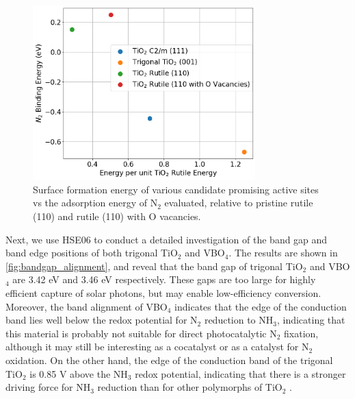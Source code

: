 \begin{figure}[h]
\centering
\includegraphics[width=8.6cm]{figures/metal_oxide_figures/Figure 7.png}
\caption{Surface formation energy of various candidate promising active sites vs the adsorption energy of N$_2$ evaluated, relative to pristine rutile (110) and rutile (110) with O vacancies. }
\label{fig:formation_vs_ads}
\end{figure}

Next, we use HSE06 to conduct a detailed investigation of the band gap and band edge positions of both trigonal TiO$_2$ and VBO$_4$. The results are shown in \ref{fig:bandgap_alignment}, and reveal that the band gap of trigonal TiO$_2$ and VBO$_4$ are 3.42 eV and 3.46 eV respectively. These gaps are too large for highly efficient capture of solar photons, but may enable low-efficiency conversion. Moreover, the band alignment of VBO$_4$ indicates that the edge of the conduction band lies well below the redox potential for N$_2$ reduction to NH$_3$, indicating that this material is probably not suitable for direct photocatalytic N$_2$ fixation, although it may still be interesting as a cocatalyst or as a catalyst for N$_2$ oxidation. On the other hand, the edge of the conduction band of the trigonal TiO$_2$ is 0.85 V above the NH$_3$ redox potential, indicating that there is a stronger driving force for NH$_3$ reduction than for other polymorphs of TiO$_2$ \cite{Comer2018AnalysisTiO2110}.

